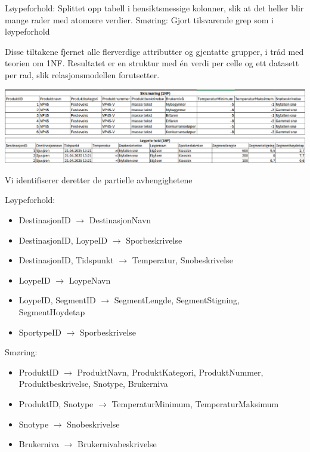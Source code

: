 \documentclass[10pt, a4paper]{article}
\begin{document}
Løypeforhold: Splittet opp tabell i hensiktsmessige kolonner, slik at det heller blir mange rader med atomære verdier.
Smøring: Gjort tilsvarende grep som i løypeforhold

Disse tiltakene fjernet alle flerverdige attributter og gjentatte grupper, i tråd med teorien om 1NF. Resultatet er en struktur med én verdi per celle og ett datasett per rad, slik relasjonsmodellen forutsetter.

\includegraphics[width=\textwidth]{skismoring_1nf.png} \\

\includegraphics[width=\textwidth]{loypeforhold_1nf.png}

Vi identifiserer deretter de partielle avhengighetene

Løypeforhold:

\begin{itemize}
	\item DestinasjonID $\rightarrow$ DestinasjonNavn 
	\item DestinasjonID, LoypeID $\rightarrow$ Sporbeskrivelse 
	\item DestinasjonID, Tidspunkt $\rightarrow$ Temperatur, Snobeskrivelse
	\item LoypeID $\rightarrow$ LoypeNavn
	\item LoypeID, SegmentID $\rightarrow$ SegmentLengde, SegmentStigning, SegmentHoydetap 
	\item SportypeID $\rightarrow$ Sporbeskrivelse 
\end{itemize}

Smøring:

\begin{itemize}
	\item ProduktID $\rightarrow$ ProduktNavn, ProduktKategori, ProduktNummer, Produktbeskrivelse, Snotype, Brukerniva
	\item ProduktID, Snotype $\rightarrow$ TemperaturMinimum, TemperaturMaksimum 
	\item Snotype $\rightarrow$ Snobeskrivelse 
	\item Brukerniva $\rightarrow$ Brukernivabeskrivelse
\end{itemize}
\end{document}
